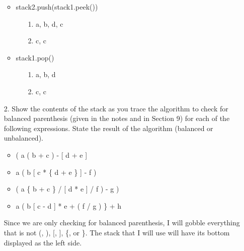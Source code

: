 \documentclass[10pt]{article}
\begin{document}
\begin{enumerate}
\begin{itemize}
\begin{enumerate}
					\end{enumerate}
				
				\item stack2.push(stack1.peek())
					
					\begin{enumerate}
						
						\item[1.] a, b, d, c
						
						\item[2.] c, c
					
					\end{enumerate}
				
				\item stack1.pop()
					
					\begin{enumerate}
						
						\item[1.] a, b, d
						
						\item[2.] c, c
					
					\end{enumerate}
					
			\end{itemize}
			\vspace{0.5cm}
		
		\item[2.] Show the contents of the stack as you trace the algorithm to check for balanced parenthesis (given in the notes and in Section 9) for each of the following expressions. State the result of the algorithm (balanced or unbalanced).
			
			\begin{itemize}
				
				\item ( a ( b + c ) - [ d + e ]
				
				\item a ( b [ c * \{ d + e \} ] - f )
				
				\item ( a \{ b + c \} / [ d * e ] / f ) - g )
				
				\item a ( b [ c - d ] * e + ( f / g ) \} + h
				
			\end{itemize}
			
			\vspace{0.5cm}
			Since we are only checking for balanced parenthesis, I will gobble everything that is not (, ), [, ], \{, or \}. The stack that I will use will have its bottom displayed as the left side.
			

\end{enumerate}
\end{document}
